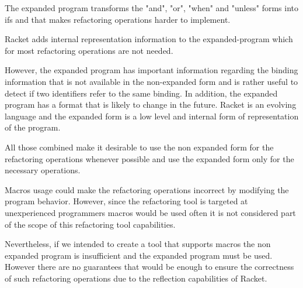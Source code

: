 The expanded program transforms the "and", "or", "when" and "unless" forms into
ifs and that makes refactoring operations harder to implement.

Racket adds internal representation information to the expanded-program which for
most refactoring operations are not needed.

However, the expanded program has important information regarding the binding
information that is not available in the non-expanded form and is rather useful
to detect if two identifiers refer to the same binding.
In addition, the expanded program has a format that is likely to change
in the future.
Racket is an evolving language and the expanded form is a low level and internal
form of representation of the program. %

All those combined make it desirable to use the non expanded form for the refactoring
operations whenever possible and use the expanded form only for the necessary
operations.


Macros usage could make the refactoring operations incorrect by modifying the   %
program behavior.
However, since the refactoring tool is targeted at unexperienced programmers macros
would be used often it is not considered part of the scope of this refactoring tool capabilities.

Nevertheless, if we intended to create a tool that supports macros the non expanded program
 is insufficient and the expanded program must be used.
However there are no guarantees that would be enough to ensure the correctness of
such refactoring operations due to the reflection capabilities of Racket.




